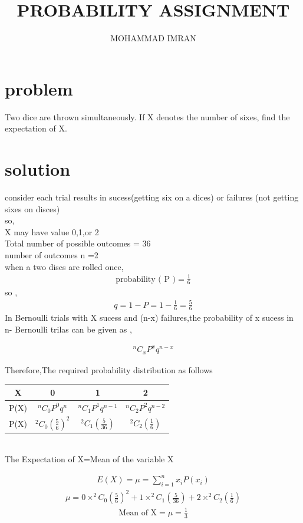 \documentclass[journal,12pt,two column]{article}
\title{PROBABILITY ASSIGNMENT}
\author{MOHAMMAD IMRAN}
\begin{document}
\maketitle
\bigskip


 \section{problem }
 Two dice are thrown simultaneously. If X denotes the number of sixes, find the
expectation of X.

\section{solution }
consider each trial results in sucess(getting six on a dices) or failures (not getting sixes on disces)\\
so,\\
X may have value 0,1,or 2\\
Total number of possible outcomes = 36\\
number of outcomes n =2\\
when a  two discs are rolled once,\\


\begin{align}
\text{probability ( P )} =
\frac{1}{6}\label{1}
 \end{align}
 so ,
 \begin{align}
  q = 1-P = 1-\frac{1}{6} = \frac{5}{6}\label{2}
 \end{align}
 In Bernoulli trials with X sucess and (n-x) failures,the probability of x sucess in n- Bernoulli trilas can be given as ,
 
\begin{align}
 ^nC_xP^xq^{n-x}\label{3}
\end{align}

Therefore,The required probability distribution as follows\\

 \begin{tabular}{ |c |c |c |c |}
 \hline
 X  &  0  &  1  &  2\\
 \hline
 
 P(X)  &  $^nC_0P^0q^n$  &  $^nC_1P^1q^{n-1}$  &  $^nC_2P^2q^{n-2}$\\
 \hline
 
 P(X)  &   $^2C_0(\frac{5}{6})^2$ &  $^2C_1(\frac{5}{36})$ &   $^2C_2(\frac{1}{6})$ \\
 \hline
 
 \end{tabular}\\
 
 
 The Expectation of X=Mean of the variable X 
 
 \begin{align}
  E(X)=\mu=\sum_{i=1}^{n} x_i P(x_i)\label{4}
\end{align}
\begin{align}
\mu=0\times^2C_0(\frac{5}{6})^2+1\times^2C_1(\frac{5}{36})+2\times^2C_2(\frac{1}{6})\label{5}
\end{align}
\begin{align}
 \text{Mean of X}=\mu=\frac{1}{3}\label{6}
 \end{align}
 
\end{document}
